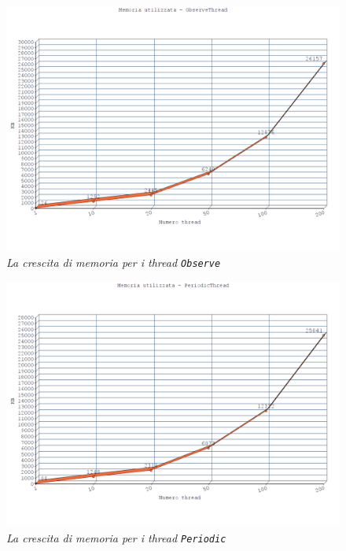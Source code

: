 \begin{figure}[p]
\centering
\includegraphics[width=\textwidth]{immagini/observe.png}
\caption{\textit{La crescita di memoria per i thread {\tt Observe}}}
\end{figure}
\begin{figure}[p]
\centering
\includegraphics[width=\textwidth]{immagini/periodic.png}
\caption{\textit{La crescita di memoria per i thread {\tt Periodic}}}
\end{figure}

